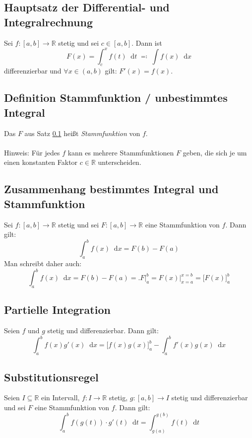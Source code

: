 \documentclass[halfparscip]{scrartcl}
\newcommand*\dif{\mathop{}\!\mathrm{d}}
\newcounter{subsection2}
\begin{document}
\subsection{Hauptsatz der Differential- und Integralrechnung}\label{Integration:Hauptsatz}
Sei $f : [a, b] \rightarrow \mathbb{R}$ stetig und sei $c \in [a, b]$. Dann ist
\begin{equation*}
	F(x) = \int_{c}^{x}f(t)\dif t \;\eqqcolon\; \int f(x) \dif x
\end{equation*}
differenzierbar und $\forall x \in (a, b)$ gilt: $F'(x) = f(x)$.

\subsection{Definition Stammfunktion / unbestimmtes Integral}
Das $F$ aus Satz \ref{Integration:Hauptsatz} heißt \textit{Stammfunktion} von $f$.\\\\
Hinweis: Für jedes $f$ kann es mehrere Stammfunktionen $F$ geben, die sich je um einen konstanten Faktor $c \in \mathbb{R}$ unterscheiden.

\subsection{Zusammenhang bestimmtes Integral und Stammfunktion}
Sei $f : [a, b] \rightarrow \mathbb{R}$ stetig und sei $F : [a, b] \rightarrow \mathbb{R}$ eine Stammfunktion von $f$. Dann gilt:
\begin{equation*}
	\int_{a}^{b} f(x) \dif x = F(b) - F(a)
\end{equation*}
Man schreibt daher auch: 
\begin{equation*}
	\int_{a}^{b} f(x) \dif x = F(b) - F(a) = \bigl. F \bigr|_a^b = F(x) \big|_{x=a}^{x=b} = \bigl[F(x)\bigr]_a^b
\end{equation*}

\addtocounter{subsection}{3}
\subsection{Partielle Integration}
Seien $f$ und $g$ stetig und differenzierbar. Dann gilt:
\begin{equation*}
	\int_a^b f(x)g'(x) \dif x = \bigl[f(x)g(x)\bigr]_a^b - \int_a^b f'(x)g(x) \dif x
\end{equation*}

\addtocounter{subsection}{2}
\subsection{Substitutionsregel}
Seien $I \subseteq \mathbb{R}$ ein Intervall, $f: I \rightarrow \mathbb{R}$ stetig, $g: [a, b] \rightarrow I$ stetig und differenzierbar und sei $F$ eine Stammfunktion von $f$. Dann gilt:
\begin{equation*}
	\int_a^b f(g(t))\cdot g'(t)\dif t = \int_{g(a)}^{g(b)} f(t) \dif t
\end{equation*}
\end{document}
